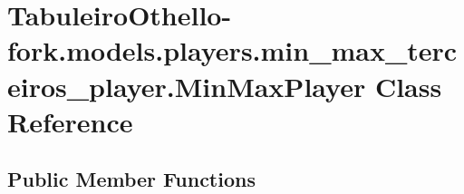 \hypertarget{class_tabuleiro_othello-fork_1_1models_1_1players_1_1min__max__terceiros__player_1_1_min_max_player}{}\section{Tabuleiro\+Othello-\/fork.models.\+players.\+min\+\_\+max\+\_\+terceiros\+\_\+player.\+Min\+Max\+Player Class Reference}
\label{class_tabuleiro_othello-fork_1_1models_1_1players_1_1min__max__terceiros__player_1_1_min_max_player}
\subsection*{Public Member Functions}

